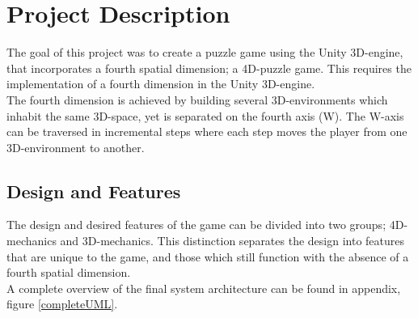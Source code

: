 \section{Project Description}
The goal of this project was to create a puzzle game using the Unity 3D-engine, that incorporates a fourth spatial dimension; a 4D-puzzle game. This requires the implementation of a fourth dimension in the Unity 3D-engine.\\

The fourth dimension is achieved by building several 3D-environments which inhabit the same 3D-space, yet is separated on the fourth axis (W). The W-axis can be traversed in incremental steps where each step moves the player from one 3D-environment to another.
 
\subsection{Design and Features}
The design and desired features of the game can be divided into two groups; 4D-mechanics and 3D-mechanics. This distinction separates the design into features that are unique to the game, and those which still function with the absence of a fourth spatial dimension.\\

A complete overview of the final system architecture can be found in appendix, figure \ref{completeUML}.

